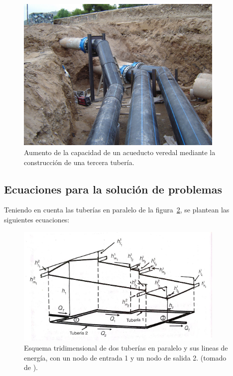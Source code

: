 \documentclass[10pt, oneside]{article}
\begin{document}
\begin{figure}[h]
\centering
\includegraphics[width=10cm]{./figs/comp31.jpeg}
\caption{Aumento de la capacidad de un acueducto veredal mediante la construcci\'on de una tercera tuber\'ia.}
\label{comp3}
\end{figure}


\subsection{Ecuaciones para la soluci\'on de problemas}
Teniendo en cuenta las tuber\'ias en paralelo de la figura~\ref{comp3}, se plantean las siguientes ecuaciones:
\begin{figure}[h]
\centering
\includegraphics[width=10cm]{./figs/comp3.jpeg}
\caption{Esquema tridimensional de dos tuber\'ias en paralelo y sus lineas de energ\'ia, con un nodo de entrada 1 y un nodo de salida 2. (tomado de \cite{saldarriaga}).} 
\label{comp3}
\end{figure}
\end{document}
